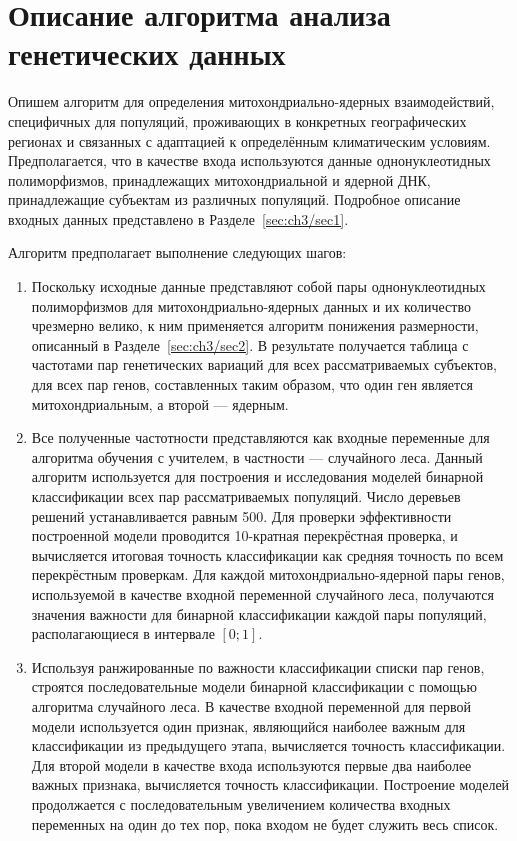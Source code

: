 \section{Описание алгоритма анализа генетических данных}\label{sec:ch3/sec3}

Опишем алгоритм для определения митохондриально-ядерных взаимодействий, специфичных для популяций, проживающих в конкретных географических регионах и связанных с адаптацией к определённым климатическим условиям. Предполагается, что в качестве входа используются данные однонуклеотидных полиморфизмов, принадлежащих митохондриальной и ядерной ДНК, принадлежащие субъектам из различных популяций. Подробное описание входных данных представлено в Разделе~\ref{sec:ch3/sec1}.

Алгоритм предполагает выполнение следующих шагов: 
\begin{enumerate}
	\item Поскольку исходные данные представляют собой пары однонуклеотидных полиморфизмов для митохондриально-ядерных данных и их количество чрезмерно велико, к ним применяется алгоритм понижения размерности, описанный в Разделе~\ref{sec:ch3/sec2}. В результате получается таблица с частотами пар генетических вариаций для всех рассматриваемых субъектов, для всех пар генов, составленных таким образом, что один ген является митохондриальным, а второй --- ядерным.
	\item Все полученные частотности представляются как входные переменные для алгоритма обучения с учителем, в частности --- случайного леса. Данный алгоритм используется для построения и исследования моделей бинарной классификации всех пар рассматриваемых популяций. Число деревьев решений устанавливается равным 500. Для проверки эффективности построенной модели проводится 10-кратная перекрёстная проверка, и вычисляется итоговая точность классификации как средняя точность по всем перекрёстным проверкам. Для каждой митохондриально-ядерной пары генов, используемой в качестве входной переменной случайного леса, получаются значения важности для бинарной классификации каждой пары популяций, располагающиеся в интервале $[0; 1]$.
	\item Используя ранжированные по важности классификации списки пар генов, строятся последовательные модели бинарной классификации с помощью алгоритма случайного леса. В качестве входной переменной для первой модели используется один признак, являющийся наиболее важным для классификации из предыдущего этапа, вычисляется точность классификации. Для второй модели в качестве входа используются первые два наиболее важных признака, вычисляется точность классификации. Построение моделей продолжается с последовательным увеличением количества входных переменных на один до тех пор, пока входом не будет служить весь список. 

\end{enumerate}
